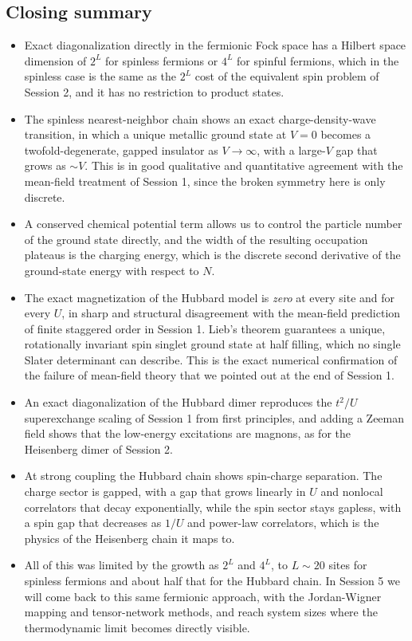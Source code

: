 \documentclass[lecture_notes.tex]{subfiles}
\begin{document}
\subsection*{Closing summary}
\begin{itemize}[nosep]
  \item Exact diagonalization directly in the fermionic Fock space has a Hilbert space dimension of
    $2^L$ for spinless fermions or $4^L$ for spinful fermions, which in the spinless case is the
    same as the $2^L$ cost of the equivalent spin problem of Session 2, and it has no restriction
    to product states.
  \item The spinless nearest-neighbor chain shows an exact charge-density-wave transition, in
    which a unique metallic ground state at $V=0$ becomes a twofold-degenerate, gapped insulator as
    $V\to\infty$, with a large-$V$ gap that grows as $\sim V$. This is in good qualitative and
    quantitative agreement with the mean-field treatment of Session 1, since the broken symmetry
    here is only discrete.
  \item A conserved chemical potential term allows us to control the particle number of the ground
    state directly, and the width of the resulting occupation plateaus is the charging energy,
    which is the discrete second derivative of the ground-state energy with respect to $N$.
  \item The exact magnetization of the Hubbard model is \emph{zero} at every site and for every
    $U$, in sharp and structural disagreement with the mean-field prediction of finite staggered
    order in Session 1. Lieb's theorem guarantees a unique, rotationally invariant spin singlet
    ground state at half filling, which no single Slater determinant can describe. This is the
    exact numerical confirmation of the failure of mean-field theory that we pointed out at the end
    of Session 1.
  \item An exact diagonalization of the Hubbard dimer reproduces the $t^2/U$ superexchange scaling
    of Session 1 from first principles, and adding a Zeeman field shows that the low-energy
    excitations are magnons, as for the Heisenberg dimer of Session 2.
  \item At strong coupling the Hubbard chain shows spin-charge separation. The charge sector is
    gapped, with a gap that grows linearly in $U$ and nonlocal correlators that decay
    exponentially, while the spin sector stays gapless, with a spin gap that decreases as $1/U$
    and power-law correlators, which is the physics of the Heisenberg chain it maps to.
  \item All of this was limited by the growth as $2^L$ and $4^L$, to $L\sim20$ sites for spinless
    fermions and about half that for the Hubbard chain. In Session 5 we will come back to this
    same fermionic approach, with the Jordan-Wigner mapping and tensor-network methods, and reach
    system sizes where the thermodynamic limit becomes directly visible.
\end{itemize}
\end{document}
